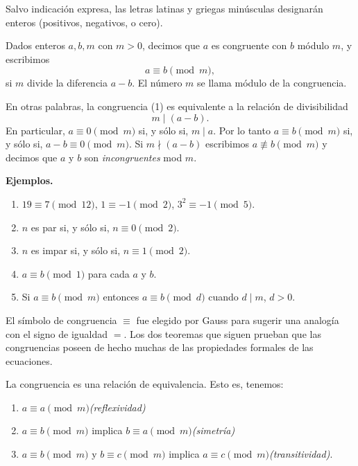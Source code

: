 \documentclass[12pt,a4paper]{book}
\begin{document}
    Salvo indicación expresa, las letras latinas y griegas minúsculas designarán enteros
    (positivos, negativos, o cero).

    \begin{definicion}
        Dados enteros $a,b,m$ con $m>0$, decimos que $a$ es congruente con $b$ módulo\label{sim:cong}
        $m$, y escribimos
        \begin{equation}
            a\equiv b\pmod{m},
        \end{equation}
        si $m$ divide la diferencia $a-b$. El número $m$ se llama módulo de la
        congruencia.
    \end{definicion}

    En otras palabras, la congruencia (1) es equivalente a la relación de divisibilidad
    \begin{equation*}
        m\mid(a-b).
    \end{equation*}
    En particular, $a\equiv0\pmod{m}$ si, y sólo si, $m\mid a$. Por lo tanto
    $a\equiv b\pmod{m}$ si, y sólo si, $a-b\equiv0\pmod{m}$. Si $m\nmid(a-b)$
    escribimos $a\not\equiv b\pmod{m}$ y decimos que $a$ y $b$ son
    \textit{incongruentes} mod $m$.

    \textbf{Ejemplos.}
    \begin{enumerate}
        \item $19\equiv7\pmod{12}$, $1\equiv-1\pmod{2}$, $3^{2}\equiv-1\pmod{5}$.
        \item $n$ es par si, y sólo si, $n\equiv0\pmod{2}$.
        \item $n$ es impar si, y sólo si, $n\equiv1\pmod{2}$.
        \item $a\equiv b\pmod{1}$ para cada $a$ y $b$.
        \item Si $a\equiv b\pmod{m}$ entonces $a\equiv b\pmod{d}$ cuando $d\mid m$, $d>0$.
    \end{enumerate}

    El símbolo de congruencia $\equiv$ fue elegido por Gauss para sugerir una analogía con
    el signo de igualdad $=$. Los dos teoremas que siguen prueban que las congruencias
    poseen de hecho muchas de las propiedades formales de las ecuaciones.

    \begin{teorema}
        La congruencia es una relación de equivalencia. Esto es, tenemos:
        \begin{enumerate}
            \item[(a)] $a\equiv a\pmod{m}$\hfill\textit{(reflexividad)}
            \item[(b)] $a\equiv b\pmod{m}$ implica $b\equiv a\pmod{m}$\hfill\textit{(simetría)}
            \item[(c)] $a\equiv b\pmod{m}$ y $b\equiv c\pmod{m}$ implica
            $a\equiv c\pmod{m}$\hfill\textit{(transitividad)}.
        \end{enumerate}
    \end{teorema}
\end{document}
